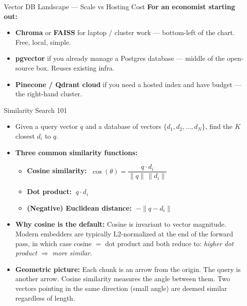 \begin{frame}{Vector DB Landscape --- Scale vs Hosting Cost}
\medskip
\textbf{For an economist starting out:}
\begin{itemize}\small
\item \textbf{Chroma} or \textbf{FAISS} for laptop / cluster work --- bottom-left of the chart. Free, local, simple.
\item \textbf{pgvector} if you already manage a Postgres database --- middle of the open-source box. Reuses existing infra.
\item \textbf{Pinecone / Qdrant cloud} if you need a hosted index and have budget --- the right-hand cluster.
\end{itemize}
\end{frame}

\begin{frame}{Similarity Search 101}
\begin{itemize}
\item Given a query vector $q$ and a database of vectors $\{d_1, d_2, \dots, d_N\}$, find the $K$ closest $d_i$ to $q$.

\medskip
\item \textbf{Three common similarity functions:}
\begin{itemize}
    \item \textbf{Cosine similarity:} $\;\cos(\theta) = \dfrac{q \cdot d_i}{\|q\| \, \|d_i\|}$
    \item \textbf{Dot product:} $\;q \cdot d_i$
    \item \textbf{(Negative) Euclidean distance:} $\;-\|q - d_i\|$
\end{itemize}

\medskip
\item \textbf{Why cosine is the default:} Cosine is invariant to vector magnitude. Modern embedders are typically L2-normalized at the end of the forward pass, in which case cosine $=$ dot product and both reduce to: \emph{higher dot product $\Rightarrow$ more similar}.

\medskip
\item \textbf{Geometric picture:} Each chunk is an arrow from the origin. The query is another arrow. Cosine similarity measures the angle between them. Two vectors pointing in the same direction (small angle) are deemed similar regardless of length.
\end{itemize}
\end{frame}

